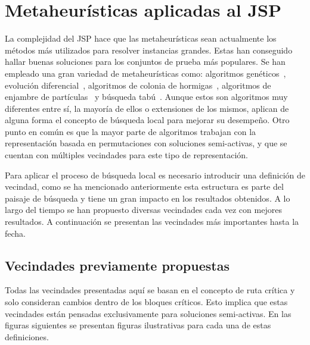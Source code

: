 \section{Metaheurísticas aplicadas al JSP}
La complejidad del JSP hace que las metaheurísticas sean actualmente los métodos más utilizados para resolver instancias grandes. 
%
Estas han conseguido hallar buenas soluciones para los conjuntos de prueba más populares. 
%
Se han empleado una gran variedad de metaheurísticas como: algoritmos genéticos~\cite{Cheng1999}, evolución diferencial~\cite{Ponsich2013}, 
algoritmos de colonia de hormigas~\cite{Klc2007}, algoritmos de enjambre de partículas~\cite{zhang2019novel} y búsqueda tabú~\cite{Zhang2007}. 
%
Aunque estos son algoritmos muy diferentes entre sí, la mayoría de ellos o extensiones de los mismos, aplican de alguna forma el concepto de 
búsqueda local para mejorar su desempeño.
%
Otro punto en común es que la mayor parte de algoritmos trabajan con la representación basada en permutaciones con soluciones semi-activas, y que se cuentan con múltiples vecindades para este tipo de representación.

Para aplicar el proceso de búsqueda local es necesario introducir una definición de vecindad, como se ha mencionado anteriormente esta estructura es parte 
del paisaje de búsqueda y tiene un gran impacto en los resultados obtenidos. 
%
A lo largo del tiempo se han propuesto diversas vecindades cada vez con mejores resultados. 
%
A continuación se presentan las vecindades más importantes hasta la fecha. 


\subsection*{Vecindades previamente propuestas}
Todas las vecindades presentadas aquí se basan en el concepto de ruta crítica y solo consideran cambios dentro de los bloques críticos. Esto implica que estas vecindades están pensadas exclusivamente para soluciones semi-activas.
%
En las figuras siguientes se presentan figuras ilustrativas para cada una de estas definiciones.

